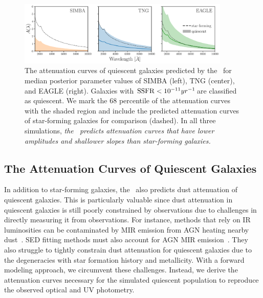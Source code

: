 \begin{figure}
\begin{center}
    \includegraphics[width=0.9\textwidth]{figs/abc_q_atten_unnorm.pdf}
    \caption{\label{fig:q_raw_atten}
    The attenuation curves of quiescent galaxies predicted by the \eda~for
    median posterior parameter values of SIMBA (left), TNG (center), and
    EAGLE (right).
    Galaxies with ${\rm SSFR} < 10^{-11}yr^{-1}$are classified as quiescent.
    We mark the 68 percentile of the attenuation curves with the shaded region
    and include the predicted attenuation curves of star-forming galaxies for
    comparison (dashed). 
    In all three simulations, \emph{the \eda~predicts attenuation curves that
    have lower amplitudes and shallower slopes than star-forming galaxies.}
    }
\end{center}
\end{figure}
\subsection{The Attenuation Curves of Quiescent Galaxies}  
In addition to star-forming galaxies, the \eda~also predicts dust attenuation
of quiescent galaxies. 
This is particularly valuable since dust attenuation in quiescent galaxies is
still poorly constrained by observations due to challenges in directly
measuring it from observations. 
For instance, methods that rely on IR luminosities can be contaminated by MIR
emission from AGN heating nearby dust~\citep{kirkpatrick2015}. 
SED fitting methods must also account for AGN MIR
emission~\citep{salim2016, leja2018, salim2018}. 
They also struggle to tightly constrain dust attenuation for quiescent galaxies
due to the degeneracies with star formation history and metallicity.
With a forward modeling approach, we circumvent these challenges. 
Instead, we derive the attenuation curves necessary for the simulated quiescent
population to reproduce the observed optical and UV photometry. 

